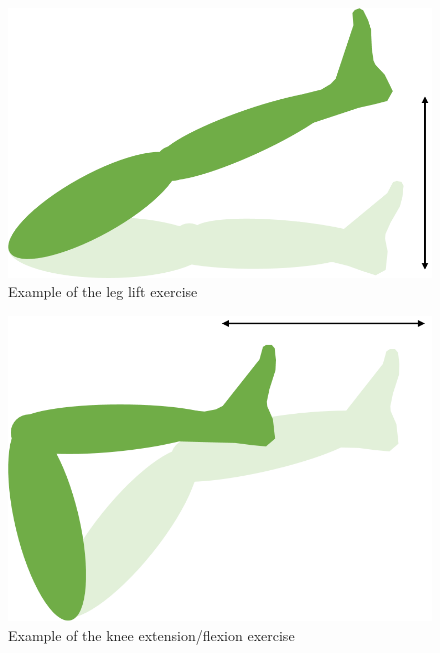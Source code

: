 \documentclass[12pt]{report}
\begin{document}
	\begin{figure}[h] 
		\centering
		\includegraphics[width=0.6\linewidth]{leg_lift}
		\caption{Example of the leg lift exercise}
		\label{fig:leg_lift}
	\end{figure}
	
		\begin{figure}[h] 
		\centering
		\includegraphics[width=0.6\linewidth]{knee_extension}
		\caption{Example of the knee extension/flexion exercise}
		\label{fig:knee_ext}
	\end{figure}
\end{document}
